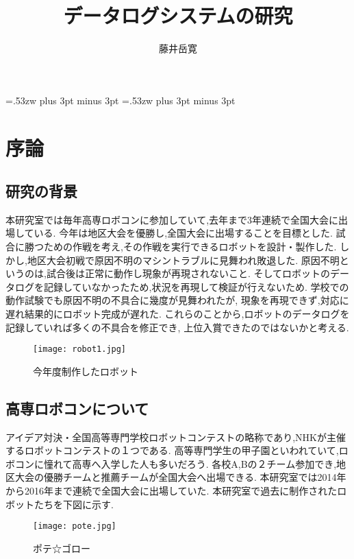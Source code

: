 \documentclass[12pt,oneside]{paper}
\title{データログシステムの研究}
\author{藤井岳寛}
\begin{document}
\setlength{\baselineskip}{9truemm}

\kanjiskip=.53zw plus 3pt minus 3pt
\xkanjiskip=.53zw plus 3pt minus 3pt

\tableofcontents


\chapter{序論}
\section{研究の背景}
本研究室では毎年高専ロボコンに参加していて,去年まで3年連続で全国大会に出場している.
今年は地区大会を優勝し,全国大会に出場することを目標とした.
試合に勝つための作戦を考え,その作戦を実行できるロボットを設計・製作した.
しかし,地区大会初戦で原因不明のマシントラブルに見舞われ敗退した.
原因不明というのは,試合後は正常に動作し現象が再現されないこと.
そしてロボットのデータログを記録していなかったため,状況を再現して検証が行えないため.
学校での動作試験でも原因不明の不具合に幾度が見舞われたが,
現象を再現できず,対応に遅れ結果的にロボット完成が遅れた.
これらのことから,ロボットのデータログを記録していれば多くの不具合を修正でき,
上位入賞できたのではないかと考える.\\


\begin{figure}[H]
 \begin{center}
  \texttt{[image: robot1.jpg]}
 \end{center}
 \caption{今年度制作したロボット}
 \label{fig:robot1}
\end{figure}


\section{高専ロボコンについて}
アイデア対決・全国高等専門学校ロボットコンテストの略称であり,NHKが主催するロボットコンテストの１つである.
高等専門学生の甲子園といわれていて,ロボコンに憧れて高専へ入学した人も多いだろう.
各校A,Bの２チーム参加でき,地区大会の優勝チームと推薦チームが全国大会へ出場できる.
本研究室では2014年から2016年まで連続で全国大会に出場していた.
本研究室で過去に制作されたロボットたちを下図に示す.\\


\begin{figure}[H]
 \begin{center}
  \texttt{[image: pote.jpg]}
 \end{center}
 \caption{ポテ☆ゴロー}
 \label{fig:pote}
\end{figure}
\end{document}
